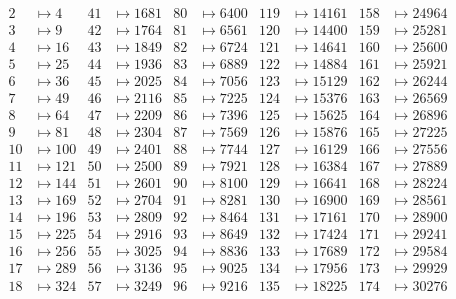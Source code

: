 \vspace*{-3\medskipamount}%
\begin{align*}
  2&\mapsto 4      &  41&\mapsto 1681   &  80&\mapsto 6400   & 119&\mapsto 14161  & 158&\mapsto 24964 \\
  3&\mapsto 9      &  42&\mapsto 1764   &  81&\mapsto 6561   & 120&\mapsto 14400  & 159&\mapsto 25281 \\
  4&\mapsto 16     &  43&\mapsto 1849   &  82&\mapsto 6724   & 121&\mapsto 14641  & 160&\mapsto 25600 \\
  5&\mapsto 25     &  44&\mapsto 1936   &  83&\mapsto 6889   & 122&\mapsto 14884  & 161&\mapsto 25921 \\
  6&\mapsto 36     &  45&\mapsto 2025   &  84&\mapsto 7056   & 123&\mapsto 15129  & 162&\mapsto 26244 \\
  7&\mapsto 49     &  46&\mapsto 2116   &  85&\mapsto 7225   & 124&\mapsto 15376  & 163&\mapsto 26569 \\
  8&\mapsto 64     &  47&\mapsto 2209   &  86&\mapsto 7396   & 125&\mapsto 15625  & 164&\mapsto 26896 \\
  9&\mapsto 81     &  48&\mapsto 2304   &  87&\mapsto 7569   & 126&\mapsto 15876  & 165&\mapsto 27225 \\
 10&\mapsto 100    &  49&\mapsto 2401   &  88&\mapsto 7744   & 127&\mapsto 16129  & 166&\mapsto 27556 \\
 11&\mapsto 121    &  50&\mapsto 2500   &  89&\mapsto 7921   & 128&\mapsto 16384  & 167&\mapsto 27889 \\
 12&\mapsto 144    &  51&\mapsto 2601   &  90&\mapsto 8100   & 129&\mapsto 16641  & 168&\mapsto 28224 \\
 13&\mapsto 169    &  52&\mapsto 2704   &  91&\mapsto 8281   & 130&\mapsto 16900  & 169&\mapsto 28561 \\
 14&\mapsto 196    &  53&\mapsto 2809   &  92&\mapsto 8464   & 131&\mapsto 17161  & 170&\mapsto 28900 \\
 15&\mapsto 225    &  54&\mapsto 2916   &  93&\mapsto 8649   & 132&\mapsto 17424  & 171&\mapsto 29241 \\
 16&\mapsto 256    &  55&\mapsto 3025   &  94&\mapsto 8836   & 133&\mapsto 17689  & 172&\mapsto 29584 \\
 17&\mapsto 289    &  56&\mapsto 3136   &  95&\mapsto 9025   & 134&\mapsto 17956  & 173&\mapsto 29929 \\
 18&\mapsto 324    &  57&\mapsto 3249   &  96&\mapsto 9216   & 135&\mapsto 18225  & 174&\mapsto 30276 \\

\end{align*}
